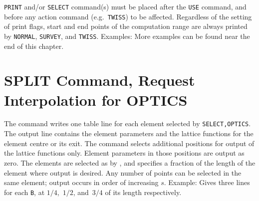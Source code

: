 {\tt PRINT} and/or {\tt SELECT} command(s)
must be placed after the {\tt USE} command,
and before any action command (e.g.~{\tt TWISS}) to be affected.
Regardless of the setting of print flags,
start and end points of the computation range are always printed
by {\tt NORMAL}, {\tt SURVEY}, and {\tt TWISS}.
Examples:
More examples can be found near the end of this chapter.
 
\section{SPLIT Command, Request Interpolation for OPTICS}
\label{S-SPLIT}
The  command writes one table line for each element
selected by {\tt SELECT,OPTICS}.
The output line contains the element parameters
and the lattice functions for the element centre or its exit.
The command
selects additional positions for output of the lattice functions only.
Element parameters in those positions are output as zero.
The elements are selected as by , and 
specifies a fraction of the length of the element where output is
desired.
Any number of points can be selected in the same element;
output occurs in order of increasing \(s\).
Example:
Gives three lines for each {\tt B},
at \(1/4\),~\(1/2\), and~\(3/4\) of its length respectively.
 
